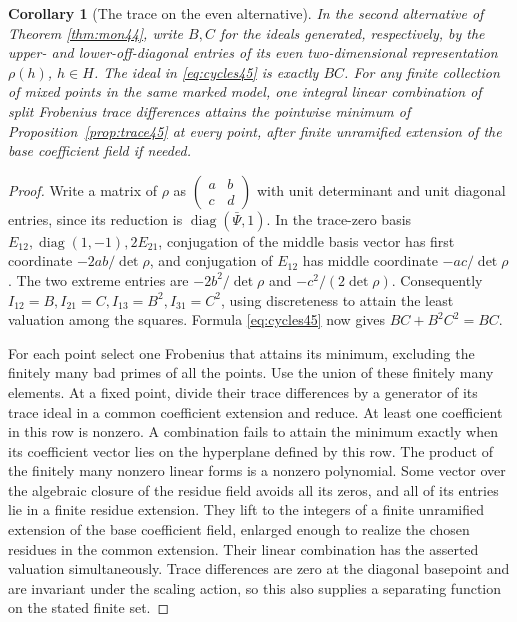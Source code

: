 \documentclass[a4paper,11pt]{article}
\newtheorem{corollary}[proposition]{Corollary}
\theoremstyle{definition}
\theoremstyle{remark}
\numberwithin{equation}{section}
\begin{document}
\begin{corollary}[The trace on the even alternative]\label{cor:even45}
In the second alternative of Theorem \ref{thm:mon44}, write \(B,C\) for the ideals generated, respectively, by the upper- and lower-off-diagonal entries of its even two-dimensional representation \(\rho(h)\), \(h\in H\). The ideal in \eqref{eq:cycles45} is exactly \(BC\). For any finite collection of mixed points in the same marked model, one integral linear combination of split Frobenius trace differences attains the pointwise minimum of Proposition~\ref{prop:trace45} at every point, after finite unramified extension of the base coefficient field if needed.
\end{corollary}
\begin{proof}
Write a matrix of \(\rho\) as \(\left(\begin{smallmatrix}a&b\\c&d\end{smallmatrix}\right)\) with unit determinant and unit diagonal entries, since its reduction is \(\operatorname{diag}(\bar\Psi,1)\). In the trace-zero basis \(E_{12},\operatorname{diag}(1,-1),2E_{21}\), conjugation of the middle basis vector has first coordinate \(-2ab/\det\rho\), and conjugation of \(E_{12}\) has middle coordinate \(-ac/\det\rho\). The two extreme entries are \(-2b^2/\det\rho\) and \(-c^2/(2\det\rho)\). Consequently \(I_{12}=B,I_{21}=C,I_{13}=B^2,I_{31}=C^2\), using discreteness to attain the least valuation among the squares. Formula \eqref{eq:cycles45} now gives \(BC+B^2 C^2=BC\).

For each point select one Frobenius that attains its minimum, excluding the finitely many bad primes of all the points. Use the union of these finitely many elements. At a fixed point, divide their trace differences by a generator of its trace ideal in a common coefficient extension and reduce. At least one coefficient in this row is nonzero. A combination fails to attain the minimum exactly when its coefficient vector lies on the hyperplane defined by this row. The product of the finitely many nonzero linear forms is a nonzero polynomial. Some vector over the algebraic closure of the residue field avoids all its zeros, and all of its entries lie in a finite residue extension. They lift to the integers of a finite unramified extension of the base coefficient field, enlarged enough to realize the chosen residues in the common extension. Their linear combination has the asserted valuation simultaneously. Trace differences are zero at the diagonal basepoint and are invariant under the scaling action, so this also supplies a separating function on the stated finite set.
\end{proof}
\end{document}
